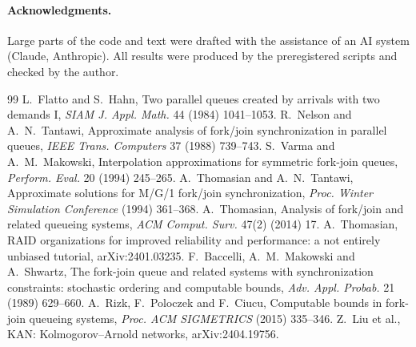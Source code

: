 \documentclass[11pt]{article}
\begin{document}
\paragraph{Acknowledgments.} Large parts of the code and text were drafted with the assistance of an AI system (Claude,
Anthropic). All results were produced by the preregistered scripts and checked by the author.

\begin{thebibliography}{99}
 L.~Flatto and S.~Hahn, Two parallel queues created by arrivals with two demands I,
\emph{SIAM J. Appl. Math.} 44 (1984) 1041--1053.
 R.~Nelson and A.~N.~Tantawi, Approximate analysis of fork/join synchronization in
parallel queues, \emph{IEEE Trans. Computers} 37 (1988) 739--743.
 S.~Varma and A.~M.~Makowski, Interpolation approximations for symmetric fork-join queues,
\emph{Perform. Eval.} 20 (1994) 245--265.
 A.~Thomasian and A.~N.~Tantawi, Approximate solutions for M/G/1 fork/join
synchronization, \emph{Proc. Winter Simulation Conference} (1994) 361--368.
 A.~Thomasian, Analysis of fork/join and related queueing systems, \emph{ACM Comput. Surv.}
47(2) (2014) 17.
 A.~Thomasian, RAID organizations for improved reliability and performance: a not entirely
unbiased tutorial, arXiv:2401.03235.
 F.~Baccelli, A.~M.~Makowski and A.~Shwartz, The fork-join queue and related systems with
synchronization constraints: stochastic ordering and computable bounds, \emph{Adv. Appl. Probab.} 21 (1989) 629--660.
 A.~Rizk, F.~Poloczek and F.~Ciucu, Computable bounds in fork-join queueing systems,
\emph{Proc. ACM SIGMETRICS} (2015) 335--346.
 Z.~Liu et al., KAN: Kolmogorov--Arnold networks, arXiv:2404.19756.
\end{thebibliography}
\end{document}
